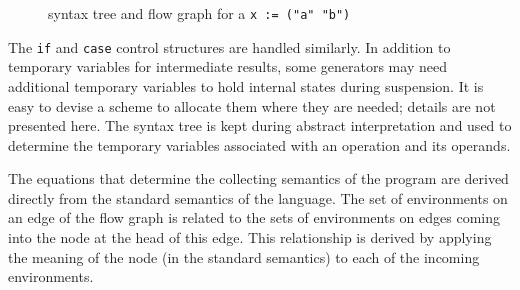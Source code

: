 \begin{figure}[htb]
\begin{center}
\end{center}
\caption{syntax tree and flow graph for a \texttt{x := ("a" {\textbar} "b")}}
\end{figure}

The \texttt{if} and \texttt{case} control structures are handled
similarly. In addition to temporary variables for intermediate
results, some generators may need additional temporary variables to
hold internal states during suspension. It is easy to devise a scheme
to allocate them where they are needed; details are not presented
here. The syntax tree is kept during abstract interpretation and used
to determine the temporary variables associated with an operation and
its operands.

The equations that determine the collecting semantics of the program
are derived directly from the standard semantics of the language. The
set of environments on an edge of the flow graph is related to the
sets of environments on edges coming into the node at the head of this
edge. This relationship is derived by applying the meaning of the node
(in the standard semantics) to each of the incoming environments.

